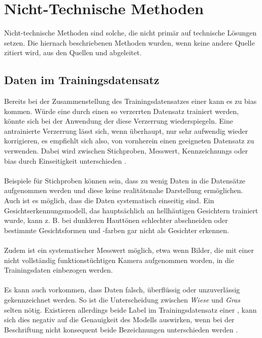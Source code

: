 \documentclass[hidelinks,12pt]{report}
\begin{document}
\section{Nicht-Technische Methoden}
Nicht-technische Methoden sind solche, die nicht primär auf technische Lösungen setzen. Die hiernach beschriebenen Methoden wurden, wenn keine andere Quelle zitiert wird, aus den Quellen \cite{UNESCO} und \cite{EUCommision} abgeleitet. 
\\
\subsection{Daten im Trainingsdatensatz}
Bereits bei der Zusammenstellung des Trainingsdatensatzes einer  kann es zu \Gls{bias}  kommen. Würde eine  durch einen so verzerrten Datensatz trainiert werden, könnte sich bei der Anwendung der  diese Verzerrung wiederspiegeln. Eine antrainierte Verzerrung lässt sich, wenn überhaupt, nur sehr aufwendig wieder korrigieren, es empfiehlt sich also, von vornherein einen geeigneten Datensatz zu verwenden. Dabei wird zwischen Stichproben, Messwert, Kennzeichnungs oder \Gls{bias} durch Einseitigkeit unterschieden \cite[S. 48ff.]{Srinivasan}.
\\\\
Beispiele für Stichproben können sein, dass zu wenig Daten in die Datensätze aufgenommen werden und diese keine realitätsnahe Darstellung ermöglichen. Auch ist es möglich, dass die Daten systematisch einseitig sind. Ein Gesichtserkennungsmodell, das hauptsächlich an hellhäutigen Gesichtern trainiert wurde, kann z. B. bei dunkleren Hauttönen schlechter abschneiden oder bestimmte Gesichtsformen und -farben gar nicht als Gesichter erkennen.
\\\\
Zudem ist ein systematischer Messwert möglich, etwa wenn Bilder, die mit einer nicht vollständig funktionstüchtigen Kamera aufgenommen worden, in die Trainingsdaten einbezogen werden.
\\\\
Es kann auch vorkommen, dass Daten falsch, überflüssig oder unzuverlässig gekennzeichnet werden. So ist die Unterscheidung zwischen \textit{Wiese} und \textit{Gras} selten nötig. Existieren allerdings beide Label im Trainingsdatensatz einer , kann sich dies negativ auf die Genauigkeit des Modells auswirken, wenn bei der Beschriftung nicht konsequent beide Bezeichnungen unterschieden werden \cite[S. 48ff.]{Srinivasan}. 
\end{document}
